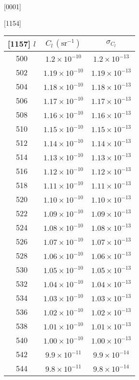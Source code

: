 [0001] \documentclass[12pt]{report}
[0002] \usepackage[utf8]{inputenc}
\begin{document}
[1154] \begin{table}[h]
[1155] \centering
[1156] \begin{tabular}{c c c}
[1157] \toprule
[1158] $l$ & $C_l \, (\text{sr}^{-1})$ & $\sigma_{C_l}$ \\
[1159] \midrule
[1160] 500 & $1.2 \times 10^{-10}$ & $1.2 \times 10^{-13}$ \\
[1161] 502 & $1.19 \times 10^{-10}$ & $1.19 \times 10^{-13}$ \\
[1162] 504 & $1.18 \times 10^{-10}$ & $1.18 \times 10^{-13}$ \\
[1163] 506 & $1.17 \times 10^{-10}$ & $1.17 \times 10^{-13}$ \\
[1164] 508 & $1.16 \times 10^{-10}$ & $1.16 \times 10^{-13}$ \\
[1165] 510 & $1.15 \times 10^{-10}$ & $1.15 \times 10^{-13}$ \\
[1166] 512 & $1.14 \times 10^{-10}$ & $1.14 \times 10^{-13}$ \\
[1167] 514 & $1.13 \times 10^{-10}$ & $1.13 \times 10^{-13}$ \\
[1168] 516 & $1.12 \times 10^{-10}$ & $1.12 \times 10^{-13}$ \\
[1169] 518 & $1.11 \times 10^{-10}$ & $1.11 \times 10^{-13}$ \\
[1170] 520 & $1.10 \times 10^{-10}$ & $1.10 \times 10^{-13}$ \\
[1171] 522 & $1.09 \times 10^{-10}$ & $1.09 \times 10^{-13}$ \\
[1172] 524 & $1.08 \times 10^{-10}$ & $1.08 \times 10^{-13}$ \\
[1173] 526 & $1.07 \times 10^{-10}$ & $1.07 \times 10^{-13}$ \\
[1174] 528 & $1.06 \times 10^{-10}$ & $1.06 \times 10^{-13}$ \\
[1175] 530 & $1.05 \times 10^{-10}$ & $1.05 \times 10^{-13}$ \\
[1176] 532 & $1.04 \times 10^{-10}$ & $1.04 \times 10^{-13}$ \\
[1177] 534 & $1.03 \times 10^{-10}$ & $1.03 \times 10^{-13}$ \\
[1178] 536 & $1.02 \times 10^{-10}$ & $1.02 \times 10^{-13}$ \\
[1179] 538 & $1.01 \times 10^{-10}$ & $1.01 \times 10^{-13}$ \\
[1180] 540 & $1.00 \times 10^{-10}$ & $1.00 \times 10^{-13}$ \\
[1181] 542 & $9.9 \times 10^{-11}$ & $9.9 \times 10^{-14}$ \\
[1182] 544 & $9.8 \times 10^{-11}$ & $9.8 \times 10^{-14}$ \\

\end{tabular}
\end{table}
\end{document}
